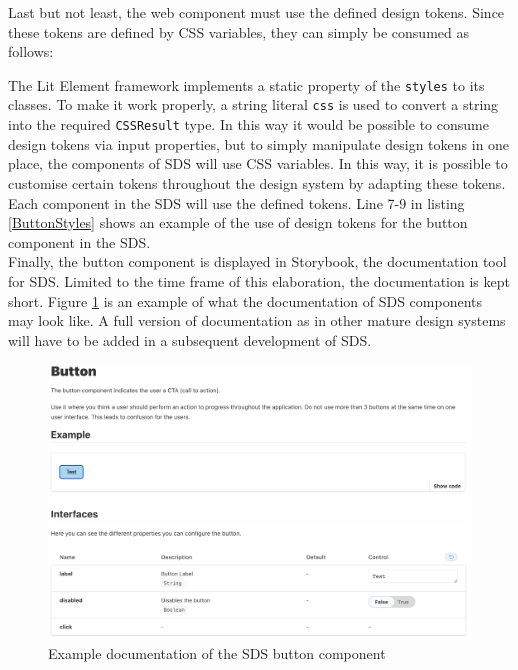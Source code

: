 Last but not least, the web component must use the defined design tokens. Since these tokens are defined by \ac{CSS} variables, they can simply be consumed as follows: 

The Lit Element framework implements a static property of the \texttt{styles} to its classes. To make it work properly, a string literal \texttt{css} is used to convert a string into the required \texttt{CSSResult} type. In this way it would be possible to consume design tokens via input properties, but to simply manipulate design tokens in one place, the components of \ac{SDS} will use \ac{CSS} variables. In this way, it is possible to customise certain tokens throughout the design system by adapting these tokens. Each component in the \ac{SDS} will use the defined tokens. Line 7-9 in listing \ref{ButtonStyles} shows an example of the use of design tokens for the button component in the \ac{SDS}. \\
Finally, the button component is displayed in Storybook, the documentation tool for \ac{SDS}. Limited to the time frame of this elaboration, the documentation is kept short. Figure \ref{storybook_button} is an example of what the documentation of \ac{SDS} components may look like. A full version of documentation as in other mature design systems will have to be added in a subsequent development of \ac{SDS}. \\
\begin{figure}[htbp]
    \centerline{\includegraphics[width=\linewidth]{images/storybook_button.png}}
    \caption{Example documentation of the \ac{SDS} button component}
    \label{storybook_button}
\end{figure}
